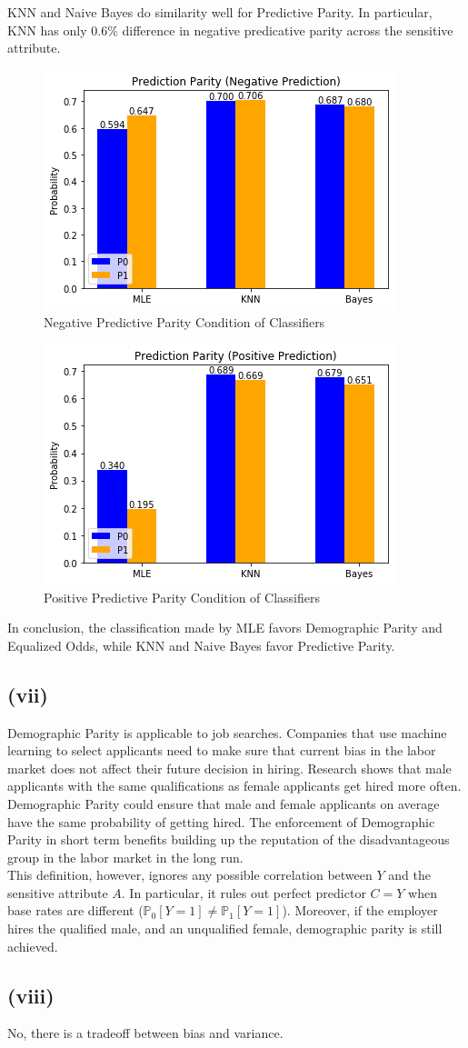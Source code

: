 \documentclass[twoside,11pt]{homework}
\begin{document}
	KNN and Naive Bayes do similarity well for Predictive Parity. In particular, KNN has only $0.6\%$ difference in 
	negative predicative parity across the sensitive attribute.
	\begin{figure}[H]
		\centering
		\includegraphics[scale=.5]{q5_fig/pp_neg.png}	
		\caption{Negative Predictive Parity Condition of Classifiers}
	\end{figure}
	\begin{figure}[H]
		\centering
		\includegraphics[scale=.5]{q5_fig/pp_pos.png}	
		\caption{Positive Predictive Parity Condition of Classifiers}
	\end{figure}
	In conclusion, the classification made by MLE favors Demographic Parity and Equalized Odds, while 
	KNN and Naive Bayes favor Predictive Parity.
\subsection*{(vii)}  
	Demographic Parity is applicable to job searches. Companies that use machine learning to select applicants need to make sure 
	that current bias in the labor market does not affect their future decision in hiring. 
	Research shows that male applicants with the same qualifications as female applicants get hired more often. 
	Demographic Parity could ensure that male and female applicants on average have the same probability of getting hired.
	The enforcement of Demographic Parity in short term benefits building up the reputation of the disadvantageous group 
	in the labor market in the long run.\\
	This definition, however, ignores any possible correlation between $Y$ and the sensitive attribute $A$. 
	In particular, it rules out perfect predictor $C=Y$ when base rates are different ($\mathbb{P}_0 [Y=1] \neq \mathbb{P}_1[Y=1]$).
	Moreover, if the employer hires the qualified male,
	and an unqualified female, demographic parity is still achieved. 


\subsection*{(viii)}  
	No, there is a tradeoff between bias and variance.
\end{document}
